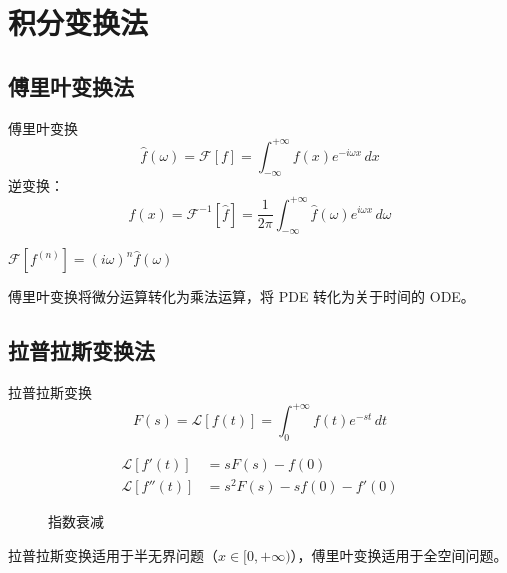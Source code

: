 ﻿\chapter{积分变换法}

\section{傅里叶变换法}

\begin{mydefinition}{傅里叶变换}
\[
\hat{f}(\omega)=\mathcal{F}[f]=\int_{-\infty}^{+\infty}f(x)e^{-i\omega x}\,dx
\]
逆变换：
\[
f(x)=\mathcal{F}^{-1}[\hat{f}]=\frac{1}{2\pi}\int_{-\infty}^{+\infty}\hat{f}(\omega)e^{i\omega x}\,d\omega
\]
\end{mydefinition}

\begin{theorem}[导数的傅里叶变换]
$\mathcal{F}[f^{(n)}]=(i\omega)^n\hat{f}(\omega)$
\end{theorem}

\begin{remark}
傅里叶变换将微分运算转化为乘法运算，将 PDE 转化为关于时间的 ODE。
\end{remark}

\section{拉普拉斯变换法}

\begin{mydefinition}{拉普拉斯变换}
\[
F(s)=\mathcal{L}[f(t)]=\int_0^{+\infty}f(t)e^{-st}\,dt
\]
\end{mydefinition}

\begin{theorem}[微分性质]
\begin{align*}
\mathcal{L}[f'(t)]&=sF(s)-f(0)\\
\mathcal{L}[f''(t)]&=s^2F(s)-sf(0)-f'(0)
\end{align*}
\end{theorem}

\begin{figure}[htbp]
\centering
{}
\caption{指数衰减}
\end{figure}

\begin{remark}
拉普拉斯变换适用于半无界问题（$x\in[0,+\infty)$），傅里叶变换适用于全空间问题。
\end{remark}
